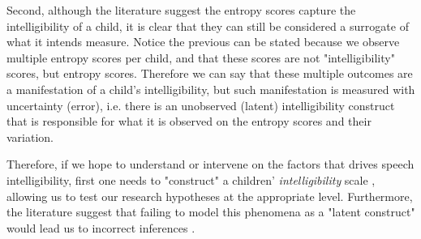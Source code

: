 Second, although the literature suggest the entropy scores capture the intelligibility of a child, it is clear that they can still be considered a surrogate of what it intends measure. Notice the previous can be stated because we observe multiple entropy scores per child, and that these scores are not "intelligibility" scores, but entropy scores. Therefore we can say that these multiple outcomes are a manifestation of a child's intelligibility, but such manifestation is measured with uncertainty (error), i.e. there is an unobserved (latent) intelligibility construct that is responsible for what it is observed on the entropy scores and their variation. 

Therefore, if we hope to understand or intervene on the factors that drives speech intelligibility, first one needs to "construct" a children' \textit{intelligibility} scale \citep{Carroll_2006}, allowing us to test our research hypotheses at the appropriate level. Furthermore, the literature suggest that failing to model this phenomena as a "latent construct" would lead us to incorrect inferences \citep{deHaan_et_al_2019}.

